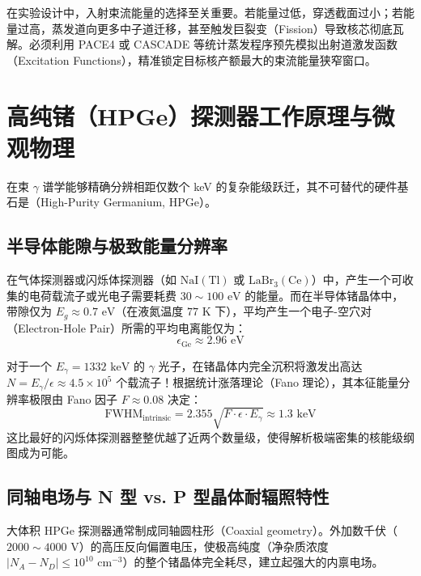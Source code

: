 在实验设计中，入射束流能量的选择至关重要。若能量过低，穿透截面过小；若能量过高，蒸发道向更多中子道迁移，甚至触发巨裂变（Fission）导致核芯彻底瓦解。必须利用 PACE4 或 CASCADE 等统计蒸发程序预先模拟出射道激发函数（Excitation Functions），精准锁定目标核产额最大的束流能量狭窄窗口。

\section{高纯锗（HPGe）探测器工作原理与微观物理}
\label{sec:hpge_detectors}

在束 $\gamma$ 谱学能够精确分辨相距仅数个 keV 的复杂能级跃迁，其不可替代的硬件基石是（High-Purity Germanium, HPGe）。

\subsection{半导体能隙与极致能量分辨率}

在气体探测器或闪烁体探测器（如 $\text{NaI}(\text{Tl})$ 或 $\text{LaBr}_3(\text{Ce})$）中，产生一个可收集的电荷载流子或光电子需要耗费 $30 \sim 100\text{ eV}$ 的能量。而在半导体锗晶体中，带隙仅为 $E_g \approx 0.7\text{ eV}$（在液氮温度 $77\text{ K}$ 下），平均产生一个电子-空穴对（Electron-Hole Pair）所需的平均电离能仅为：
\begin{equation}
    \epsilon_{\text{Ge}} \approx 2.96\text{ eV}
\end{equation}

对于一个 $E_\gamma = 1332\text{ keV}$ 的 $\gamma$ 光子，在锗晶体内完全沉积将激发出高达 $N = E_\gamma / \epsilon \approx 4.5 \times 10^5$ 个载流子！根据统计涨落理论（Fano 理论），其本征能量分辨率极限由 Fano 因子 $F \approx 0.08$ 决定：
\begin{equation}
    \text{FWHM}_{\text{intrinsic}} = 2.355 \sqrt{F \cdot \epsilon \cdot E_\gamma} \approx 1.3\text{ keV}
\end{equation}
这比最好的闪烁体探测器整整优越了近两个数量级，使得解析极端密集的核能级纲图成为可能。

\subsection{同轴电场与 N 型 vs. P 型晶体耐辐照特性}

大体积 HPGe 探测器通常制成同轴圆柱形（Coaxial geometry）。外加数千伏（$2000 \sim 4000\text{ V}$）的高压反向偏置电压，使极高纯度（净杂质浓度 $|N_A - N_D| \le 10^{10}\text{ cm}^{-3}$）的整个锗晶体完全耗尽，建立起强大的内禀电场。

